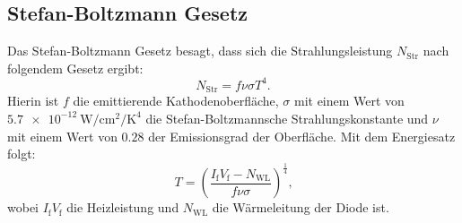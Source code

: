 \subsection{Stefan-Boltzmann Gesetz}
Das Stefan-Boltzmann Gesetz besagt, dass sich die Strahlungsleistung $N_\text{Str}$ nach folgendem Gesetz ergibt:
\begin{equation}
	N_\text{Str} = f \nu \sigma T^4\text{.} \label{eq:Strahlungsleistung}
\end{equation}
Hierin ist $f$ die emittierende Kathodenoberfläche, $\sigma$ mit einem Wert von $\SI{5.7e-12}{\watt\per\centi\meter\squared\per\kelvin\tothe{4}}$ \cite{V504} die Stefan-Boltzmannsche Strahlungskonstante und $\nu$ mit einem Wert von $\num{0.28}$ \cite{V504} der Emissionsgrad der Oberfläche. Mit dem Energiesatz folgt:
\begin{equation}
	T = \left(\frac{I_\text{f} V_\text{f} -N_\text{WL}}{f \nu \sigma}\right)^\frac{1}{4}\text{,} \label{eq:TausLeistung}
\end{equation}
wobei $I_\text{f} V_\text{f}$ die Heizleistung und $N_\text{WL}$ die Wärmeleitung der Diode ist.

